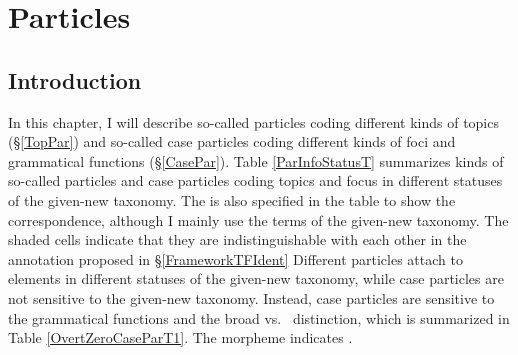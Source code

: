 \chapter{Particles}\label{Particles}



\section{Introduction}\label{ParIntro}

In this chapter, I will describe
so-called  particles coding different kinds of topics (\S \ref{TopPar})
and
so-called case particles coding different kinds of foci and grammatical functions (\S \ref{CasePar}).
Table \ref{ParInfoStatusT} summarizes kinds of so-called  particles and case particles
coding topics and focus in different statuses of the given-new taxonomy.
The  is also specified in the table to show the correspondence,
although I mainly use the terms of the given-new taxonomy.
The shaded cells indicate that they are indistinguishable with each other in the annotation proposed in \S \ref{FrameworkTFIdent}
Different  particles attach to elements in different statuses of the given-new taxonomy,
while case particles are not sensitive to the given-new taxonomy.
Instead, case particles are sensitive to the grammatical functions and the broad vs.\  distinction,
which is summarized in Table \ref{OvertZeroCaseParT1}.
The morpheme  indicates .


